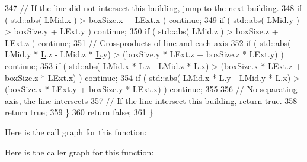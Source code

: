 \begin{DoxyCode}
347                 \textcolor{comment}{// If the line did not intersect this building, jump to the next building.}
348                 \textcolor{keywordflow}{if} ( std::abs( LMid.x ) > boxSize.x + LExt.x ) \textcolor{keywordflow}{continue};
349                 \textcolor{keywordflow}{if} ( std::abs( LMid.y ) > boxSize.y + LExt.y ) \textcolor{keywordflow}{continue};
350                 \textcolor{keywordflow}{if} ( std::abs( LMid.z ) > boxSize.z + LExt.z ) \textcolor{keywordflow}{continue};
351                 \textcolor{comment}{// Crossproducts of line and each axis}
352                 \textcolor{keywordflow}{if} ( std::abs( LMid.y * \hyperlink{loss__ITU1411__NLOS__over__rooftop_8m_a0f93e2c2e7c447b4dfc5bcac7e346da1}{L}.z - LMid.z * \hyperlink{loss__ITU1411__NLOS__over__rooftop_8m_a0f93e2c2e7c447b4dfc5bcac7e346da1}{L}.y)  >  (boxSize.y * LExt.z + boxSize.z * LExt.y)
       ) \textcolor{keywordflow}{continue};
353                 \textcolor{keywordflow}{if} ( std::abs( LMid.x * \hyperlink{loss__ITU1411__NLOS__over__rooftop_8m_a0f93e2c2e7c447b4dfc5bcac7e346da1}{L}.z - LMid.z * \hyperlink{loss__ITU1411__NLOS__over__rooftop_8m_a0f93e2c2e7c447b4dfc5bcac7e346da1}{L}.x)  >  (boxSize.x * LExt.z + boxSize.z * LExt.x)
       ) \textcolor{keywordflow}{continue};
354                 \textcolor{keywordflow}{if} ( std::abs( LMid.x * \hyperlink{loss__ITU1411__NLOS__over__rooftop_8m_a0f93e2c2e7c447b4dfc5bcac7e346da1}{L}.y - LMid.y * \hyperlink{loss__ITU1411__NLOS__over__rooftop_8m_a0f93e2c2e7c447b4dfc5bcac7e346da1}{L}.x)  >  (boxSize.x * LExt.y + boxSize.y * LExt.x)
       ) \textcolor{keywordflow}{continue};
355 
356                 \textcolor{comment}{// No separating axis, the line intersects}
357                 \textcolor{comment}{// If the line intersect this building, return true.}
358                 \textcolor{keywordflow}{return} \textcolor{keyword}{true};
359         \}
360         \textcolor{keywordflow}{return} \textcolor{keyword}{false};
361 \}
\end{DoxyCode}


Here is the call graph for this function\+:




Here is the caller graph for this function\+:


